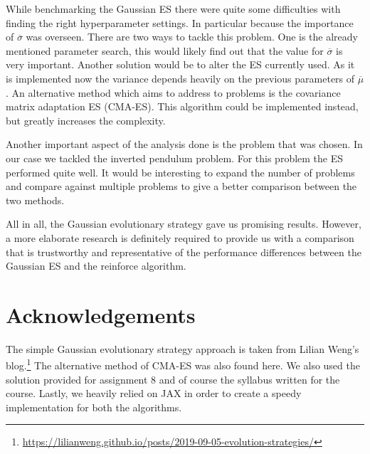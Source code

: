 \documentclass{article}
\begin{document}
While benchmarking the Gaussian ES there were quite some difficulties with
finding the right hyperparameter settings. In particular because the importance
of $\overline\sigma$ was overseen. There are two ways to tackle this problem.
One is the already mentioned parameter search, this would likely find out that
the value for $\overline\sigma$ is very important. Another solution would be to
alter the ES currently used. As it is implemented now the variance depends
heavily on the previous parameters of $\overline\mu$. An alternative method
which aims to address to problems is the covariance matrix adaptation ES
(CMA-ES). This algorithm could be implemented instead, but greatly increases
the complexity.

Another important aspect of the analysis done is the problem that was chosen.
In our case we tackled the inverted pendulum problem. For this problem the ES
performed quite well. It would be interesting to expand the number of problems
and compare against multiple problems to give a better comparison between the
two methods.

All in all, the Gaussian evolutionary strategy gave us promising results.
However, a more elaborate research is definitely required to provide us with a
comparison that is trustworthy and representative of the performance
differences between the Gaussian ES and the reinforce algorithm.


\section*{Acknowledgements}
The simple Gaussian evolutionary strategy approach is taken from Lilian Weng's
blog.\footnote{\url{https://lilianweng.github.io/posts/2019-09-05-evolution-strategies/}}
The alternative method of CMA-ES was also found here. We also used the solution
provided for assignment 8 and of course the syllabus written for the course.
Lastly, we heavily relied on JAX in order to create a speedy implementation for
both the algorithms.
\end{document}
